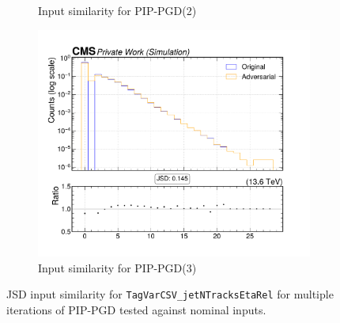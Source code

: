 \begin{figure}[htbp]
\begin{subfigure}[t]{0.32\textwidth}
    \caption*{Input similarity for PIP-PGD(2)}
  \end{subfigure}\hfill
  \begin{subfigure}[t]{0.32\textwidth}
    \includegraphics[width=\linewidth]{media/output/features/compare/combined_it_3/cmp_global_features_TagVarCSV_jetNTracksEtaRel.pdf}
    \caption*{Input similarity for PIP-PGD(3)}
  \end{subfigure}

  \caption*{JSD input similarity for \texttt{TagVarCSV\_jetNTracksEtaRel} for multiple iterations of PIP-PGD tested against nominal inputs.}
  \label{fig:combined_input_TagVarCSV_jetNTracksEtaRel}
\end{figure}

